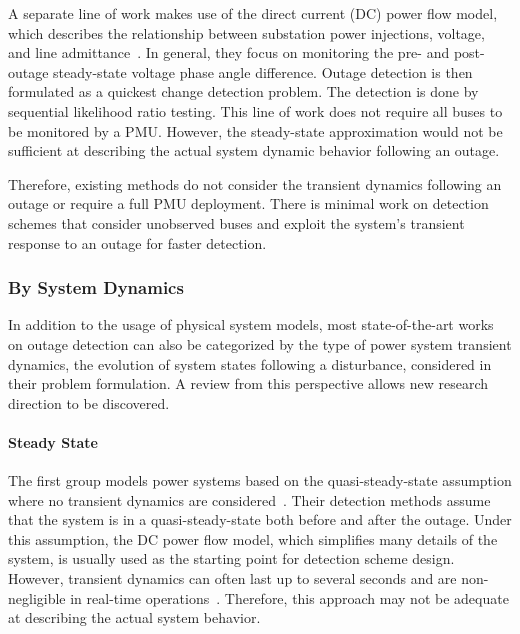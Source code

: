 A separate line of work makes use of the direct current (DC) power flow model, which describes the relationship between substation power injections, voltage, and line admittance~\cite{Chen2016,Babakmehr2016}. In general, they focus on monitoring the pre- and post-outage steady-state voltage phase angle difference. Outage detection is then formulated as a quickest change detection problem. The detection is done by sequential likelihood ratio testing. 
This line of work does not require all buses to be monitored by a PMU. However, the steady-state approximation would not be sufficient at describing the actual system dynamic behavior following an outage. 

Therefore, existing methods do not consider the transient dynamics following an outage or require a full PMU deployment. There is minimal work on detection schemes that consider unobserved buses and exploit the system's transient response to an outage for faster detection.

\subsubsection{By System Dynamics} %
\label{ssub:by_dynamics}

In addition to the usage of physical system models, most state-of-the-art works on outage detection can also be categorized by the type of power system transient dynamics, the evolution of system states following a disturbance, considered in their problem formulation. A review from this perspective allows new research direction to be discovered.

\paragraph{Steady State}
The first group models power systems based on the quasi-steady-state assumption where no transient dynamics are considered~\cite{Tate2008, tate2009double, babakmehr2015application,Chen2016, ardakanian2017event,Ardakanian2019a}. Their detection methods assume that the system is in a quasi-steady-state both before and after the outage. Under this assumption, the DC power flow model, which simplifies many details of the system, is usually used as the starting point for detection scheme design. However, transient dynamics can often last up to several seconds and are non-negligible in real-time operations~\cite{Glover2012}. Therefore, this approach may not be adequate at describing the actual system behavior. 

